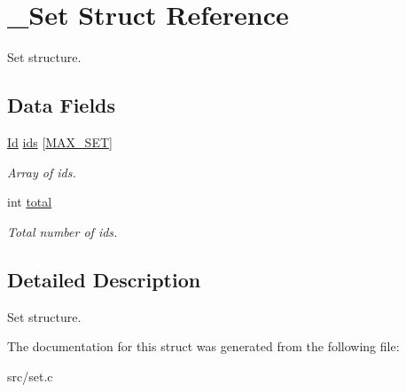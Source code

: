 \hypertarget{struct__Set}{}\section{\+\_\+\+Set Struct Reference}
\label{struct__Set}


Set structure.  


\subsection*{Data Fields}
\begin{DoxyCompactItemize}
\item 
\mbox{\label{struct__Set_a3b2034bbfee5ca2b0dde5b6073c264cc}} 
\hyperlink{types_8h_a845e604fb28f7e3d97549da3448149d3}{Id} \hyperlink{struct__Set_a3b2034bbfee5ca2b0dde5b6073c264cc}{ids} \mbox{[}\hyperlink{set_8h_abc21882f4958e6b56aaf2f3c18f80d43}{M\+A\+X\+\_\+\+S\+ET}\mbox{]}
\begin{DoxyCompactList}\small\item\em Array of id\textquotesingle{}s. \end{DoxyCompactList}\item 
\mbox{\label{struct__Set_a9ae5f2cab9df62f0a98dd683be804878}} 
int \hyperlink{struct__Set_a9ae5f2cab9df62f0a98dd683be804878}{total}
\begin{DoxyCompactList}\small\item\em Total number of id\textquotesingle{}s. \end{DoxyCompactList}\end{DoxyCompactItemize}


\subsection{Detailed Description}
Set structure. 

The documentation for this struct was generated from the following file\+:\begin{DoxyCompactItemize}
\item 
src/set.\+c\end{DoxyCompactItemize}
